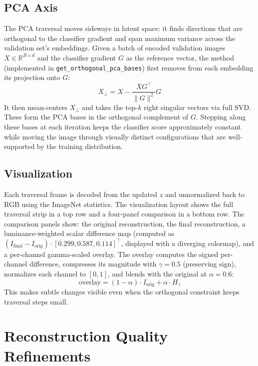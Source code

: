 \documentclass[conference,compsoc]{IEEEtran}
\begin{document}
\subsection{PCA Axis}
\label{sec:pca}
The PCA traversal moves sideways in latent space: it finds directions that are orthogonal to the classifier gradient and span maximum variance across the validation set's embeddings. Given a batch of encoded validation images $X \in \mathbb{R}^{B \times d}$ and the classifier gradient $G$ as the reference vector, the method (implemented in \texttt{get\_orthogonal\_pca\_bases}) first removes from each embedding its projection onto $G$:
\begin{equation}
    X_{\perp} = X - \frac{X G^\top}{\|G\|^2} G
\end{equation}
It then mean-centers $X_\perp$ and takes the top-$k$ right singular vectors via full SVD. These form the PCA bases in the orthogonal complement of $G$. Stepping along these bases at each iteration keeps the classifier score approximately constant while moving the image through visually distinct configurations that are well-supported by the training distribution.
\subsection{Visualization}
\label{sec:visualization}
Each traversal frame is decoded from the updated $z$ and unnormalized back to RGB using the ImageNet statistics. The visualization layout shows the full traversal strip in a top row and a four-panel comparison in a bottom row. The comparison panels show: the original reconstruction, the final reconstruction, a luminance-weighted scalar difference map (computed as $(I_{\text{final}} - I_{\text{orig}}) \cdot [0.299, 0.587, 0.114]^\top$, displayed with a diverging colormap), and a per-channel gamma-scaled overlay. The overlay computes the signed per-channel difference, compresses its magnitude with $\gamma = 0.5$ (preserving sign), normalizes each channel to $[0,1]$, and blends with the original at $\alpha = 0.6$:
\begin{equation}
    \text{overlay} = (1 - \alpha) \cdot I_{\text{orig}} + \alpha \cdot H_\gamma
\end{equation}
This makes subtle changes visible even when the orthogonal constraint keeps traversal steps small.

\section{Reconstruction Quality Refinements}
\label{sec:reconstruction-refinements}
\end{document}
